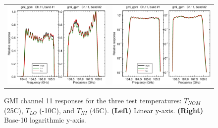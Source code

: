 \begin{figure}[htp]
  \centering
  \begin{tabular}{c c}
    \includegraphics[scale=0.3]{graphics/lin/gmi_gpm-11.eps} &
    \includegraphics[scale=0.3]{graphics/log/gmi_gpm-11.eps}
  \end{tabular}
  \caption{GMI channel 11 responses for the three test temperatures: $T_{NOM}$ (25\textdegree{}C), $T_{LO}$ (-10\textdegree{}C), and $T_{HI}$ (45\textdegree{}C). \textbf{(Left)} Linear y-axis. \textbf{(Right)} Base-10 logarithmic y-axis.}
  \label{fig:ch11_response}
\end{figure}

